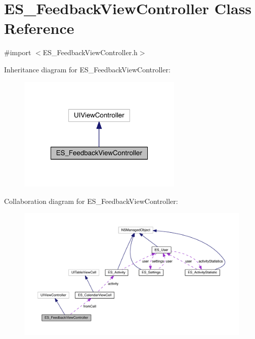 \hypertarget{interface_e_s___feedback_view_controller}{\section{E\+S\+\_\+\+Feedback\+View\+Controller Class Reference}
\label{interface_e_s___feedback_view_controller}
}


{\ttfamily \#import $<$E\+S\+\_\+\+Feedback\+View\+Controller.\+h$>$}



Inheritance diagram for E\+S\+\_\+\+Feedback\+View\+Controller\+:\nopagebreak
\begin{figure}[H]
\begin{center}
\leavevmode
\includegraphics[width=222pt]{d8/d4d/interface_e_s___feedback_view_controller__inherit__graph}
\end{center}
\end{figure}


Collaboration diagram for E\+S\+\_\+\+Feedback\+View\+Controller\+:\nopagebreak
\begin{figure}[H]
\begin{center}
\leavevmode
\includegraphics[width=350pt]{da/d15/interface_e_s___feedback_view_controller__coll__graph}
\end{center}
\end{figure}
